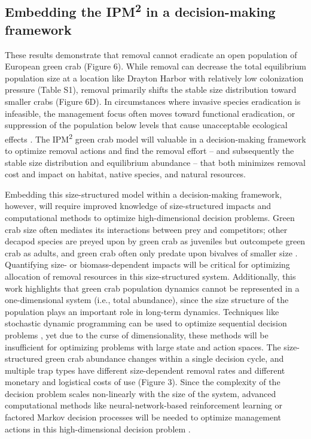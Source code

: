 \documentclass{article}
\begin{document}
\subsection{Embedding the IPM\textsuperscript{2} in a decision-making framework}

These results demonstrate that removal cannot eradicate an open population of European green crab (Figure 6). While removal can decrease the total equilibrium population size at a location like Drayton Harbor with relatively low colonization pressure (Table S1), removal primarily shifts the stable size distribution toward smaller crabs (Figure 6D). In circumstances where invasive species eradication is infeasible, the management focus often moves toward functional eradication, or suppression of the population below levels that cause unacceptable ecological effects \parencite{green2021functional}. The IPM\textsuperscript{2} green crab model will valuable in a decision-making framework to optimize removal actions and find the removal effort – and subsequently the stable size distribution and equilibrium abundance – that both minimizes removal cost and impact on habitat, native species, and natural resources. 

Embedding this size-structured model within a decision-making framework, however, will require improved knowledge of size-structured impacts and computational methods to optimize high-dimensional decision problems. Green crab size often mediates its interactions between prey and competitors; other decapod species are preyed upon by green crab as juveniles but outcompete green crab as adults, and green crab often only predate upon bivalves of smaller size \parencite{grosholz2005recent, williams2009competition, mcdonald2001competitive, curtis2012prey}. Quantifying size- or biomass-dependent impacts will be critical for optimizing allocation of removal resources in this size-structured system. Additionally, this work highlights that green crab population dynamics cannot be represented in a one-dimensional system (i.e., total abundance), since the size structure of the population plays an important role in long-term dynamics. Techniques like stochastic dynamic programming can be used to optimize sequential decision problems \parencite{marescot2013complex}, yet due to the curse of dimensionality, these methods will be insufficient for optimizing problems with large state and action spaces. The size-structured green crab abundance changes within a single decision cycle, and multiple trap types have different size-dependent removal rates and different monetary and logistical costs of use (Figure 3). Since the complexity of the decision problem scales non-linearly with the size of the system, advanced computational methods like neural-network-based reinforcement learning or factored Markov decision processes will be needed to optimize management actions in this high-dimensional decision problem \parencite{lapeyrolerie2022deep, nicol2015adapting}. 
\end{document}
